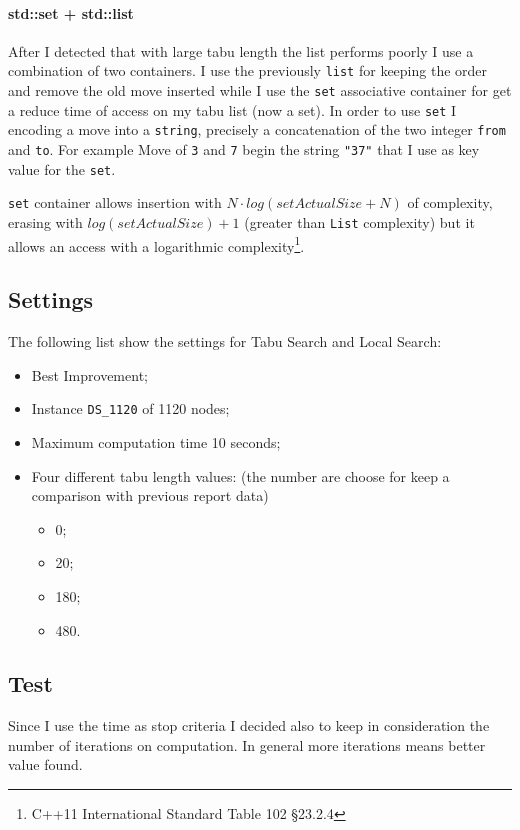 \documentclass[]{article}
\begin{document}
		\paragraph{std::set + std::list} After I detected that with large tabu length the list performs poorly I use a combination of two containers. I use the previously \verb|list| for keeping the order and remove the old move inserted while I use the \verb|set| associative container for get a reduce time of access on my tabu list (now a set). In order to use \verb|set| I encoding a move into a \verb|string|, precisely a concatenation of the two integer \verb|from| and \verb|to|. For example Move of \verb|3| and \verb|7| begin the string \verb|"37"| that I use as key value for the \verb|set|.
		
		\verb|set| container allows insertion  with $N \cdot log (setActualSize + N)$ of complexity, erasing with $log(setActualSize) +  1$ (greater than \verb|List| complexity) but it allows an access with a logarithmic complexity\footnote{C++11 International Standard Table 102 §23.2.4}. 

\subsection{Settings}
\label{subsec:settings}
The following list show the settings for Tabu Search and Local Search:
\begin{itemize}
	\item Best Improvement;
	\item Instance \verb|DS_1120| of 1120 nodes;
	\item Maximum computation time 10 seconds;
	\item Four different tabu length values: (the number are choose for keep a comparison with previous report data)
	\begin{itemize}
		\item 0;
		\item 20;
		\item 180;
		\item 480.
	\end{itemize}
\end{itemize}

\subsection{Test}
	Since I use the time as stop criteria I decided also to keep in consideration the number of iterations on computation. In general more iterations means better value found.
	
\end{document}
